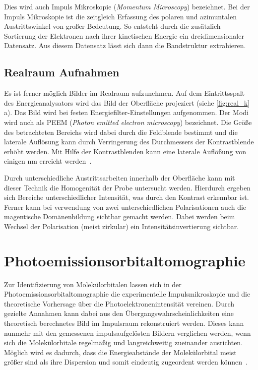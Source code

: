             Dies wird auch Impuls Mikroskopie (\textit{Momentum Microscopy}) bezeichnet.
            Bei der Impuls Mikroskopie ist die zeitgleich Erfassung des polaren und azimuntalen Austrittswinkel von großer Bedeutung. 
            So entsteht durch die zusätzlich Sortierung der Elektronen nach ihrer kinetischen Energie ein dreidimensionaler Datensatz.
            Aus diesem Datensatz lässt sich dann die Bandstruktur extrahieren.

        \subsection{Realraum Aufnahmen}
            Es ist ferner möglich Bilder im Realraum aufzunehmen.
            Auf dem Eintrittsspalt des Energieanalysators wird das Bild der Oberfläche projeziert (siehe \autoref{fig:real_k}\,a).
            Das Bild wird bei festen Energiefilter-Einstellungen aufgenommen.
            Der Modi wird auch als PEEM (\textit{Photon emitted electron microscopy}) bezeichnet.
            Die Größe des betrachteten Bereichs wird dabei durch die Feldblende bestimmt und die laterale Auflösung kann durch Verringerung des Durchmessers der Kontrastblende erhöht werden.
            Mit Hilfe der Kontrastblenden kann eine laterale Auflößung von einigen \si{\nano\meter} erreicht werden~\cite{locatelli_chemical_2015}. 

            Durch unterschiedliche Austrittsarbeiten innerhalb der Oberfläche kann mit dieser Technik die Homogenität der Probe untersucht werden.
            Hierdurch ergeben sich Bereiche unterschiedlicher Intensität, was durch den Kontrast erkennbar ist.
            Ferner kann bei verwendung von zwei unterschiedlichen Polarisationen auch die magentische Domänenbildung sichtbar gemacht werden.
            Dabei werden beim Wechsel der Polarisation (meist zirkular) ein Intensitätsinvertierung sichtbar.
        
    \section{Photoemissionsorbitaltomographie} \label{sec:MOT}
        Zur Identifizierung von Molekülorbitalen lassen sich in der Photoemissionsorbitaltomographie die experimentelle Impulsmikroskopie und die theoretische Vorhersage über die Photoelektronenintensität vereinen.
        Durch gezielte Annahmen kann dabei aus den Übergangswahrscheinlichkeiten eine theoretisch berechnetes Bild im Impulsraum rekonstruiert werden.
        Dieses kann nunmehr mit den gemessenen impulsaufgelösten Bildern verglichen werden, wenn sich die Molekülorbitale regelmäßig und langreichweitig zueinander ausrichten.
        Möglich wird es dadurch, dass die Energieabstände der Molekülorbital meist größer sind als ihre Dispersion und somit eindeutig zugeordent werden können~\cite{puschnig_reconstruction_2009}.

